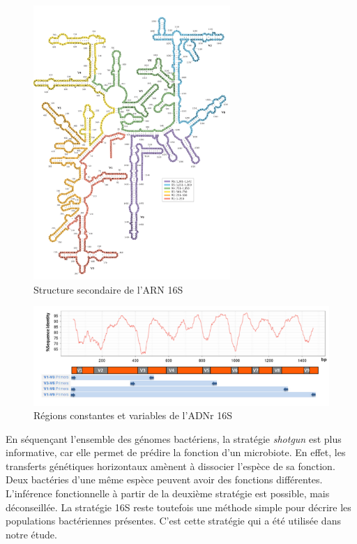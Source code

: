 \documentclass[12pt,a4paper]{article}
\begin{document}
\begin{figure}[ht]
\begin{center}
\includegraphics[scale=0.8]{img/ARN_16S.png}\hfill
\end{center}
\caption{Structure secondaire de l'ARN 16S}
\label{ARN16S}
\end{figure}

\begin{figure}[ht]
\begin{center}
\includegraphics[scale=0.8]{img/ARN16S_variation.png}\hfill
\end{center}
\caption{Régions constantes et variables de l'ADNr 16S}
\label{ARN16SVariation}
\end{figure}

En séquençant l'ensemble des génomes bactériens, la stratégie \textit{shotgun} est plus informative, car elle permet de prédire la fonction d'un microbiote. En effet, les transferts génétiques horizontaux amènent à dissocier l'espèce de sa fonction. Deux bactéries d'une même espèce peuvent avoir des fonctions différentes. L'inférence fonctionnelle à partir de la deuxième stratégie est possible, mais déconseillée.
La stratégie 16S reste toutefois une méthode simple pour décrire les populations bactériennes présentes. C'est cette stratégie qui a été utilisée dans notre étude.
\end{document}

